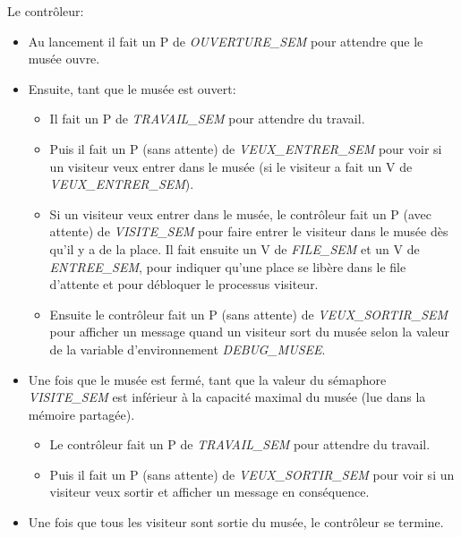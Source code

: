 \documentclass[a4paper,12pt,DIV=16]{scrreprt}
\begin{document}
    Le contrôleur:
    \begin{itemize}
        \item Au lancement il fait un P de \emph{OUVERTURE\_SEM} pour attendre que le musée ouvre.
        \item Ensuite, tant que le musée est ouvert:
            \begin{itemize}
                \item Il fait un P de \emph{TRAVAIL\_SEM} pour attendre du travail.
                \item Puis il fait un P (sans attente) de \emph{VEUX\_ENTRER\_SEM} pour voir si un
                    visiteur veux entrer dans le musée (si le visiteur a fait un V de
                    \emph{VEUX\_ENTRER\_SEM}).
                \item Si un visiteur veux entrer dans le musée, le contrôleur fait un P (avec
                    attente) de \emph{VISITE\_SEM} pour faire entrer le visiteur dans le musée
                    dès qu'il y a de la place. Il fait ensuite un V de \emph{FILE\_SEM} et un V de
                    \emph{ENTREE\_SEM}, pour indiquer qu'une place se libère dans le file d'attente
                    et pour débloquer le processus visiteur.
                \item Ensuite le contrôleur fait un P (sans attente) de \emph{VEUX\_SORTIR\_SEM} pour
                    afficher un message quand un visiteur sort du musée selon la valeur de la
                    variable d'environnement \emph{DEBUG\_MUSEE}.
            \end{itemize}
        \item Une fois que le musée est fermé, tant que la valeur du sémaphore \emph{VISITE\_SEM}
            est inférieur à la capacité maximal du musée (lue dans la mémoire partagée).
            \begin{itemize}
                \item Le contrôleur fait un P de \emph{TRAVAIL\_SEM} pour attendre du travail.
                \item Puis il fait un P (sans attente) de \emph{VEUX\_SORTIR\_SEM} pour voir si
                    un visiteur veux sortir et afficher un message en conséquence.
            \end{itemize}
        \item Une fois que tous les visiteur sont sortie du musée, le contrôleur se termine.
    \end{itemize}

    \newpage
\end{document}

